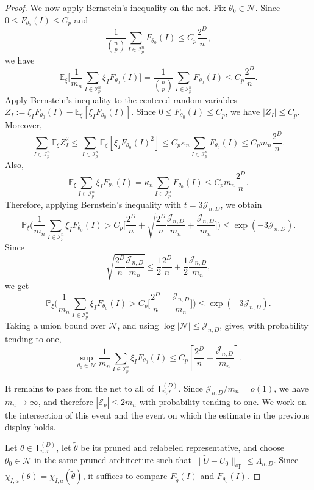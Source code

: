 \documentclass[12pt]{article}
\newcommand{\E}{\mathbb{E}}
\renewcommand{\P}{\mathbb{P}}
\newcommand{\mcE}{\mathcal{E}}
\newcommand{\mcI}{\mathcal{I}}
\newcommand{\mcJ}{\mathcal{J}}
\begin{document}
\begin{proof}
We now apply Bernstein's inequality on the net.
Fix \(\theta_0\in\mathcal N\). Since \(0\le F_{\theta_0}(I)\le C_p\) and
\[
\frac1{\binom np}\sum_{I\in\mcI_p^n}F_{\theta_0}(I)
\le
C_p\frac{2^D}{n},
\]
we have
\[
\E_\xi
\bigg[
\frac1{m_n}\sum_{I\in\mcI_p^n}\xi_I F_{\theta_0}(I)
\bigg]
=
\frac1{\binom np}\sum_{I\in\mcI_p^n}F_{\theta_0}(I)
\le
C_p\frac{2^D}{n}.
\]
Apply Bernstein's inequality to the centered random variables $Z_I
    :=
    \xi_I F_{\theta_0}(I)
    -
    \E_\xi[\xi_I F_{\theta_0}(I)]$.
Since \(0\le F_{\theta_0}(I)\le C_p\), we have \(|Z_I|\le C_p\). Moreover,
\[
\sum_{I\in\mcI_p^n}\E_\xi Z_I^2
\le
\sum_{I\in\mcI_p^n}
\E_\xi[\xi_I F_{\theta_0}(I)^2]
\le
C_p\kappa_n\sum_{I\in\mcI_p^n}F_{\theta_0}(I)
\le
C_p m_n\frac{2^D}{n}.
\]
Also,
\[
\E_\xi
\sum_{I\in\mcI_p^n}\xi_I F_{\theta_0}(I)
=
\kappa_n\sum_{I\in\mcI_p^n}F_{\theta_0}(I)
\le
C_p m_n\frac{2^D}{n}.
\]
Therefore, applying Bernstein's inequality with \(t=3\mcJ_{n,D}\), we obtain
\[
\P_\xi \bigg(
\frac1{m_n}\sum_{I\in\mcI_p^n}\xi_I F_{\theta_0}(I)
>
C_p\bigg[
\frac{2^D}{n}
+
\sqrt{
\frac{2^D}{n}\frac{\mcJ_{n,D}}{m_n}
}
+
\frac{\mcJ_{n,D}}{m_n}
\bigg]
\bigg)
\le
\exp(-3\mcJ_{n,D}).
\]
Since
\[
\sqrt{
\frac{2^D}{n}\frac{\mcJ_{n,D}}{m_n}
}
\le
\frac12\frac{2^D}{n}
+
\frac12\frac{\mcJ_{n,D}}{m_n},
\]
we get
\[
\P_\xi\bigg(
\frac1{m_n}\sum_{I\in\mcI_p^n}\xi_I F_{\theta_0}(I)
>
C_p\bigg[
\frac{2^D}{n}
+
\frac{\mcJ_{n,D}}{m_n}
\bigg]
\bigg)
\le
\exp(-3\mcJ_{n,D}).
\]
Taking a union bound over \(\mathcal N\), and using
\(\log|\mathcal N|\le \mcJ_{n,D}\), gives, with probability tending to one,
\[
\sup_{\theta_0\in\mathcal N}
\frac1{m_n}
\sum_{I\in\mcI_p^n}\xi_I F_{\theta_0}(I)
\le
C_p
\left[
\frac{2^D}{n}
+
\frac{\mcJ_{n,D}}{m_n}
\right].
\]

It remains to pass from the net to all of \(\mathsf{T}_{n,r}^{(D)}\). Since
\(\mcJ_{n,D}/m_n=o(1)\), we have \(m_n\to\infty\), and therefore $|\mcE_p|\le 2m_n$ with probability tending to one. We work on the intersection of this event and the event on which the estimate in the previous display holds.

Let \(\theta\in\mathsf{T}_{n,r}^{(D)}\), let \(\widetilde\theta\) be its
pruned and relabeled representative, and choose
\(\theta_0\in\mathcal N\) in the same pruned architecture such that
$\|\widetilde U-U_0\|_{\mathrm{op}}
    \le
    \Lambda_{n,D}$.
Since \(\chi_{I,a}(\theta)=\chi_{I,a}(\widetilde\theta)\), it suffices to
compare \(F_{\tilde\theta}(I)\) and \(F_{\theta_0}(I)\).


\end{proof}
\end{document}
